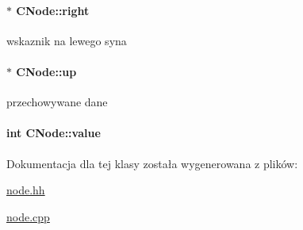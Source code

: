 \paragraph[{right}]{$\ast$ C\+Node\+::right\hspace{0.3cm}{\ttfamily [private]}}\label{class_c_node_ac2fe09b3646c8a3ee913b2cfd5ab240a}
wskaznik na lewego syna \hypertarget{class_c_node_a486e2a7c35852d9e93f9b91af687697b}{}
\paragraph[{up}]{$\ast$ C\+Node\+::up\hspace{0.3cm}{\ttfamily [private]}}\label{class_c_node_a486e2a7c35852d9e93f9b91af687697b}
przechowywane dane \hypertarget{class_c_node_ad08aa99402f6cfbbb9d9580d1f001441}{}
\paragraph[{value}]{\setlength{\rightskip}{0pt plus 5cm}int C\+Node\+::value\hspace{0.3cm}{\ttfamily [private]}}\label{class_c_node_ad08aa99402f6cfbbb9d9580d1f001441}


Dokumentacja dla tej klasy została wygenerowana z plików\+:\begin{DoxyCompactItemize}
\item 
\hyperlink{node_8hh}{node.\+hh}\item 
\hyperlink{node_8cpp}{node.\+cpp}\end{DoxyCompactItemize}
